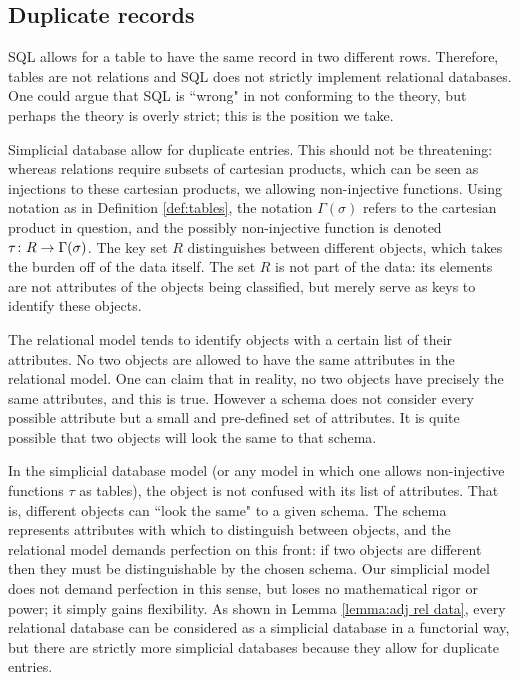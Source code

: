 \documentclass{amsart}
\begin{document}
\subsection{Duplicate records}\label{subsec:duplication}

SQL allows for a table to have the same record in two different rows.  Therefore, tables are not relations and SQL does not strictly implement relational databases.  One could argue that SQL is ``wrong" in not conforming to the theory, but perhaps the theory is overly strict; this is the position we take.  

Simplicial database allow for duplicate entries.  This should not be threatening: whereas relations require subsets of cartesian products, which can be seen as injections to these cartesian products, we allowing non-injective functions.  Using notation as in Definition \ref{def:tables}, the notation $\Gamma(\sigma)$ refers to the cartesian product in question, and the possibly non-injective function is denoted  $\tau\colon R\rightarrow\Gamma(\sigma)$.  The key set $R$ distinguishes between different objects, which takes the burden off of the data itself.  The set $R$ is not part of the data: its elements are not attributes of the objects being classified, but merely serve as keys to identify these objects.  

The relational model tends to identify objects with a certain list of their attributes.  No two objects are allowed to have the same attributes in the relational model.  One can claim that in reality, no two objects have precisely the same attributes, and this is true.  However a schema does not consider every possible attribute but a small and pre-defined set of attributes.  It is quite possible that two objects will look the same to that schema. 

In the simplicial database model (or any model in which one allows non-injective functions $\tau$ as tables), the object is not confused with its list of attributes.  That is, different objects can ``look the same" to a given schema.  The schema represents attributes with which to distinguish between objects, and the relational model demands perfection on this front: if two objects are different then they must be distinguishable by the chosen schema.  Our simplicial model does not demand perfection in this sense, but loses no mathematical rigor or power; it simply gains flexibility.  As shown in Lemma \ref{lemma:adj rel data}, every relational database can be considered as a simplicial database in a functorial way, but there are strictly more simplicial databases because they allow for duplicate entries.
\end{document}
